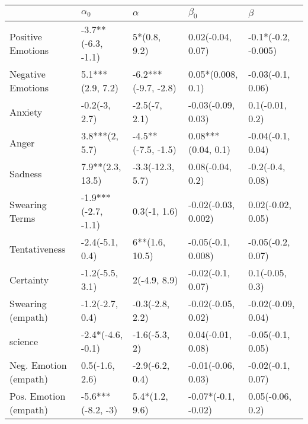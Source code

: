 \begin{tabular}{lllll}
\toprule
{} &           $\alpha_0$ &             $\alpha$ &            $\beta_0$ &              $\beta$ \\
\midrule
Positive Emotions     &   -3.7**(-6.3, -1.1) &         5*(0.8, 9.2) &    0.02(-0.04, 0.07) &  -0.1*(-0.2, -0.005) \\
Negative Emotions     &     5.1***(2.9, 7.2) &  -6.2***(-9.7, -2.8) &    0.05*(0.008, 0.1) &    -0.03(-0.1, 0.06) \\
Anxiety               &        -0.2(-3, 2.7) &        -2.5(-7, 2.1) &   -0.03(-0.09, 0.03) &      0.1(-0.01, 0.2) \\
Anger                 &       3.8***(2, 5.7) &   -4.5**(-7.5, -1.5) &   0.08***(0.04, 0.1) &    -0.04(-0.1, 0.04) \\
Sadness               &     7.9**(2.3, 13.5) &     -3.3(-12.3, 5.7) &     0.08(-0.04, 0.2) &     -0.2(-0.4, 0.08) \\
Swearing Terms        &  -1.9***(-2.7, -1.1) &         0.3(-1, 1.6) &  -0.02(-0.03, 0.002) &    0.02(-0.02, 0.05) \\
Tentativeness         &      -2.4(-5.1, 0.4) &       6**(1.6, 10.5) &   -0.05(-0.1, 0.008) &    -0.05(-0.2, 0.07) \\
Certainty             &      -1.2(-5.5, 3.1) &         2(-4.9, 8.9) &    -0.02(-0.1, 0.07) &      0.1(-0.05, 0.3) \\
Swearing (empath)     &      -1.2(-2.7, 0.4) &      -0.3(-2.8, 2.2) &   -0.02(-0.05, 0.02) &   -0.02(-0.09, 0.04) \\
science               &    -2.4*(-4.6, -0.1) &        -1.6(-5.3, 2) &    0.04(-0.01, 0.08) &    -0.05(-0.1, 0.05) \\
Neg. Emotion (empath) &       0.5(-1.6, 2.6) &      -2.9(-6.2, 0.4) &   -0.01(-0.06, 0.03) &    -0.02(-0.1, 0.07) \\
Pos. Emotion (empath) &    -5.6***(-8.2, -3) &       5.4*(1.2, 9.6) &  -0.07*(-0.1, -0.02) &     0.05(-0.06, 0.2) \\
\bottomrule
\end{tabular}
